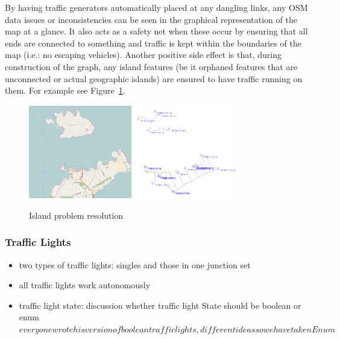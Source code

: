 By having traffic generators automatically placed at any dangling links, any OSM data issues or inconsistencies can be seen in the graphical representation of the map at a glance. It also acts as a safety net when these occur by ensuring that all ends are connected to something and traffic is kept within the boundaries of the map (i.e.: no escaping vehicles). Another positive side effect is that, during construction of the graph, any island features (be it orphaned features that are unconnected or actual geographic islands) are ensured to have traffic running on them. For example see Figure~\ref{fig:islandReal}.

\begin{figure}[!h]
	\vspace{1.5em}
  	\caption{Island problem resolution}
  	\label{fig:islandReal}
  	\centering
	\includegraphics[width=0.4\textwidth]{figs/trafficGenerator/IslandExample_realmap.png}
	\hspace{0.2em}
	\includegraphics[width=0.40\textwidth]{figs/trafficGenerator/IslandExample_simmap.png}
  	\vspace{1.5em}
\end{figure}

\subsubsection{Traffic Lights}
\begin{itemize}
    \item two types of traffic lights: singles and those in one junction set
    \item all traffic lights work autonomously
	\item traffic light state: discussion whether traffic light State should be boolean or enum \(everyone wrote his version of boolean traffic lights, different ideas so we have taken Enum\)
\end{itemize}

